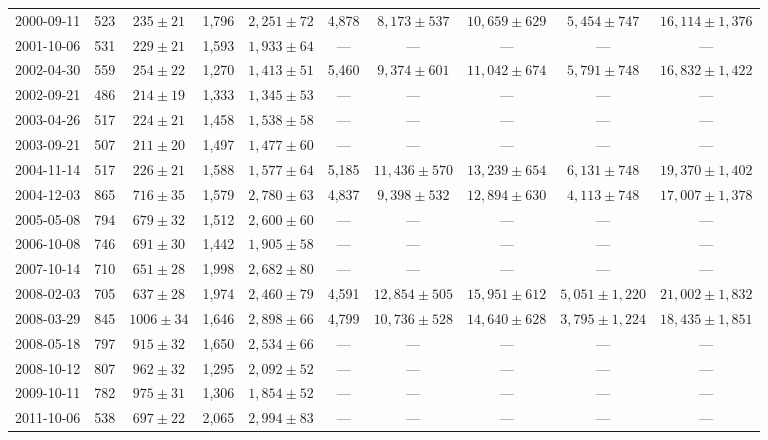 \begin{landscape}
\begin{longtable}{cccccccccc}
{2000-09-11} & 523 & {$235  \pm  21$} & 1,796 & {$2,251 \pm 72$} & 4,878 & {$8,173 \pm 537$} & {$10,659 \pm 629$} & {$5,454 \pm 747$} & {$16,114 \pm 1,376$} \\
{2001-10-06} & 531 & {$229  \pm  21$} & 1,593 & {$1,933 \pm 64$} & --- & --- & --- & --- & --- \\
{2002-04-30} & 559 & {$254  \pm  22$} & 1,270 & {$1,413 \pm 51$} & 5,460 & {$9,374 \pm 601$} & {$11,042 \pm 674$} & {$5,791 \pm 748$} & {$16,832 \pm 1,422$} \\
{2002-09-21} & 486 & {$214  \pm  19$} & 1,333 & {$1,345 \pm 53$} & --- & --- & --- & --- & --- \\
{2003-04-26} & 517 & {$224  \pm  21$} & 1,458 & {$1,538 \pm 58$} & --- & --- & --- & --- & --- \\
{2003-09-21} & 507 & {$211  \pm  20$} & 1,497 & {$1,477 \pm 60$} & --- & --- & --- & --- & --- \\
{2004-11-14} & 517 & {$226  \pm  21$} & 1,588 & {$1,577 \pm 64$} & 5,185 & {$11,436 \pm 570$} & {$13,239 \pm 654$} & {$6,131 \pm 748$} & {$19,370 \pm 1,402$} \\
{2004-12-03} & 865 & {$716  \pm  35$} & 1,579 & {$2,780 \pm 63$} & 4,837 & {$9,398 \pm 532$} & {$12,894 \pm 630$} & {$4,113 \pm 748$} & {$17,007 \pm 1,378$} \\
{2005-05-08} & 794 & {$679  \pm  32$} & 1,512 & {$2,600 \pm 60$} & --- & --- & --- & --- & --- \\
{2006-10-08} & 746 & {$691  \pm  30$} & 1,442 & {$1,905 \pm 58$} & --- & --- & --- & --- & --- \\
{2007-10-14} & 710 & {$651  \pm  28$} & 1,998 & {$2,682 \pm 80$} & --- & --- & --- & --- & --- \\
{2008-02-03} & 705 & {$637  \pm  28$} & 1,974 & {$2,460 \pm 79$} & 4,591 & {$12,854 \pm 505$} & {$15,951 \pm 612$} & {$5,051 \pm 1,220$} & {$21,002 \pm 1,832$} \\
{2008-03-29} & 845 & {$1006  \pm  34$} & 1,646 & {$2,898 \pm 66$} & 4,799 & {$10,736 \pm 528$} & {$14,640 \pm 628$} & {$3,795 \pm 1,224$} & {$18,435 \pm 1,851$} \\
{2008-05-18} & 797 & {$915  \pm  32$} & 1,650 & {$2,534 \pm 66$} & --- & --- & --- & --- & --- \\
{2008-10-12} & 807 & {$962  \pm  32$} & 1,295 & {$2,092 \pm 52$} & --- & --- & --- & --- & --- \\
{2009-10-11} & 782 & {$975  \pm  31$} & 1,306 & {$1,854 \pm 52$} & --- & --- & --- & --- & --- \\
{2011-10-06} & 538 & {$697  \pm  22$} & 2,065 & {$2,994 \pm 83$} & --- & --- & --- & --- & --- \\

\end{longtable}
\end{landscape}
